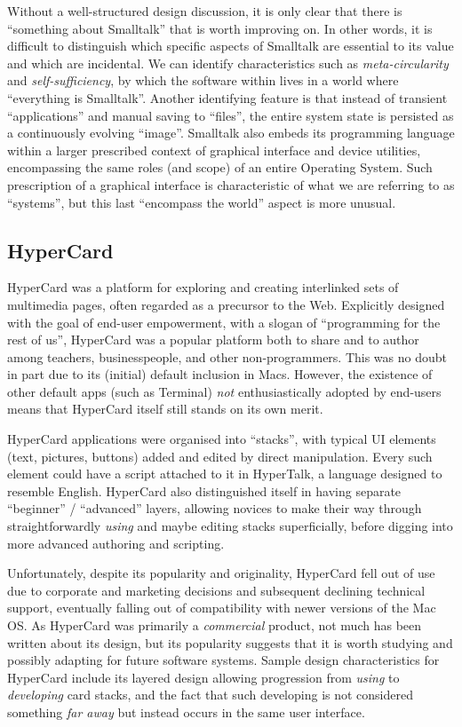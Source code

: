 Without a well-structured design discussion, it is only clear that there
is ``something about Smalltalk'' that is worth improving on. In other
words, it is difficult to distinguish which specific aspects of
Smalltalk are essential to its value and which are incidental. We can
identify characteristics such as \emph{meta-circularity} and
\emph{self-sufficiency}, by which the software within lives in a world
where ``everything is Smalltalk''. Another identifying feature is that
instead of transient ``applications'' and manual saving to ``files'',
the entire system state is persisted as a continuously evolving
``image''. Smalltalk also embeds its programming language within a
larger prescribed context of graphical interface and device utilities,
encompassing the same roles (and scope) of an entire Operating System.
Such prescription of a graphical interface is characteristic of what we
are referring to as ``systems'', but this last ``encompass the world''
aspect is more unusual.

\hypertarget{hypercard}{%
\subsection{HyperCard}\label{hypercard}}

HyperCard was a platform for exploring and creating interlinked sets of
multimedia pages, often regarded as a precursor to the Web. Explicitly
designed with the goal of end-user empowerment, with a slogan of
``programming for the rest of us'', HyperCard was a popular platform
both to share and to author among teachers, businesspeople, and other
non-programmers. This was no doubt in part due to its (initial) default
inclusion in Macs. However, the existence of other default apps (such as
Terminal) \emph{not} enthusiastically adopted by end-users means that
HyperCard itself still stands on its own merit.

HyperCard applications were organised into ``stacks'', with typical UI
elements (text, pictures, buttons) added and edited by direct
manipulation. Every such element could have a script attached to it in
HyperTalk, a language designed to resemble English. HyperCard also
distinguished itself in having separate ``beginner'' / ``advanced''
layers, allowing novices to make their way through straightforwardly
\emph{using} and maybe editing stacks superficially, before digging into
more advanced authoring and scripting.

Unfortunately, despite its popularity and originality, HyperCard fell
out of use due to corporate and marketing decisions and subsequent
declining technical support, eventually falling out of compatibility
with newer versions of the Mac OS. As HyperCard was primarily a
\emph{commercial} product, not much has been written about its design,
but its popularity suggests that it is worth studying and possibly
adapting for future software systems. Sample design characteristics for
HyperCard include its layered design allowing progression from
\emph{using} to \emph{developing} card stacks, and the fact that such
developing is not considered something \emph{far away} but instead
occurs in the same user interface.

